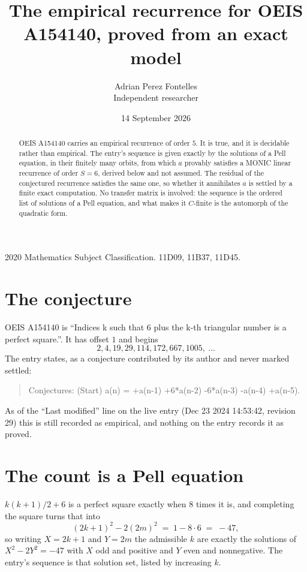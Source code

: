 \documentclass[11pt,a4paper]{article}
\title{The empirical recurrence for OEIS A154140, proved from an exact model}
\author{Adrian Perez Fontelles\\ \small Independent researcher}
\date{14 September 2026}
\theoremstyle{plain}
\theoremstyle{definition}
\begin{document}
\maketitle

\begin{abstract}
OEIS A154140 carries an empirical recurrence of order $5$. It is true, and it is
decidable rather than empirical. The entry's sequence is given exactly by the solutions of a Pell equation, in their finitely many orbits, from
which $a$ provably satisfies a MONIC linear recurrence of order $S=6$, derived below and not
assumed. The residual of the conjectured recurrence satisfies the same one, so whether it
annihilates $a$ is settled by a finite exact computation. No transfer matrix is involved: the sequence is the ordered list of solutions of a Pell equation, and what makes it $C$-finite is the automorph of the quadratic form.
\end{abstract}

\noindent\small 2020 Mathematics Subject Classification. 11D09, 11B37, 11D45.\normalsize

\section{The conjecture}

OEIS A154140 is ``Indices k such that 6 plus the k-th triangular number is a perfect square.''. It has offset $1$ and begins
\[
2, 4, 19, 29, 114, 172, 667, 1005,\ \dots
\]
The entry states, as a conjecture contributed by its author and never marked settled:
\begin{quote}
Conjectures: (Start) a(n) = +a(n-1) +6*a(n-2) -6*a(n-3) -a(n-4) +a(n-5).
\end{quote}
As of the ``Last modified'' line on the live entry (Dec 23 2024 14:53:42, revision 29)
this is still recorded as empirical, and nothing on the entry records it as proved.

\section{The count is a Pell equation}

$k(k+1)/2 + 6$ is a perfect square exactly when $8$ times it is, and completing the square
turns that into
\[
(2k+1)^2-2(2m)^2\;=\;1-8\cdot6\;=\;-47,
\]
so writing $X=2k+1$ and $Y=2m$ the admissible $k$ are exactly the solutions of $X^2-2Y^2=-47$
with $X$ odd and positive and $Y$ even and nonnegative. The entry's sequence is that solution
set, listed by increasing $k$.
\end{document}
